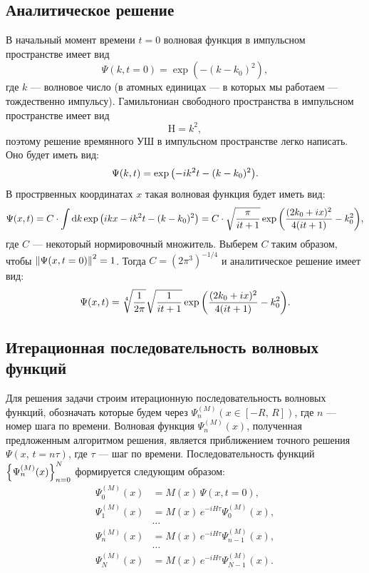 \documentclass[10pt]{article}
\begin{document}
\subsection*{Аналитическое решение}

В начальный момент времени $t=0$ волновая функция в импульсном пространстве имеет вид $$\Psi(k,t=0) = \exp(-(k-k_0)^2),$$ где $k$ --- волновое число (в атомных единицах --- в которых мы работаем --- тождественно импульсу). Гамильтониан свободного пространства в импульсном пространстве имеет вид $$ \mathrm{H} = k^2,$$ поэтому решение времянного УШ в импульсном пространстве легко написать. Оно будет иметь вид:
\begin{equation}
 \Psi(k,t) =\exp\qty(-i k^2 t - (k-k_0)^2).
\end{equation}
В прострвенных координатах $x$ такая волновая функция будет иметь вид:
\begin{equation}
 \Psi(x,t) =  C \cdot \int \dd{k} \exp\qty(ikx -i k^2 t - (k-k_0)^2) = C \cdot \sqrt{\dfrac{\pi}{it+1}} \exp\qty(\dfrac{(2k_0 + ix)^2}{4(it+1)} - k_0^2),
\end{equation}
где $C$ --- некоторый нормировочный множитель. Выберем $C$ таким образом, чтобы $\norm{\Psi(x,t=0)}^2=1$. Тогда $C=(2\pi^3)^{-1/4}$ и аналитическое решение имеет вид:
\begin{equation}
 \Psi(x,t) = \sqrt[4]{\dfrac{1}{2\pi}} \sqrt{\dfrac{1}{it+1}} \exp\qty(\dfrac{(2k_0 + ix)^2}{4(it+1)} - k_0^2).
\end{equation}

\subsection*{Итерационная последовательность волновых функций}
Для решения задачи строим итерационную последовательность волновых функций, обозначать которые будем через $\Psi^{(M)}_n(x\in[-R,\,R])$, где $n$ --- номер шага по времени. Волновая функция $\Psi^{(M)}_n(x)$, полученная предложенным алгоритмом решения, является приближением точного решения $\Psi(x,\, t=n\tau)$, где $\tau$ --- шаг по времени. Последовательность функций $\qty{\Psi^{(M)}_n(x)}_{n=0}^{N}$ формируется следующим образом:
\begin{equation}
	\begin{split}
		\Psi^{(M)}_0(x) &= M(x)\, \Psi(x,t=0),\\
		\Psi^{(M)}_1(x) &= M(x)\, e^{-i H \tau} \Psi^{(M)}_0(x),\\
		&\ldots\\
		\Psi^{(M)}_n(x) &= M(x)\, e^{-i H \tau} \Psi^{(M)}_{n-1}(x),\\
		&\ldots\\
		\Psi^{(M)}_N(x) &= M(x)\, e^{-i H \tau} \Psi^{(M)}_{N-1}(x).
	\end{split}
\end{equation}
\end{document}

